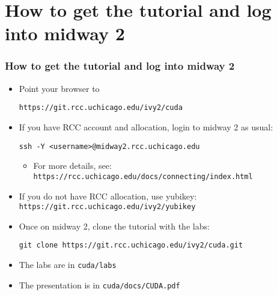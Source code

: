 \section{How to get the tutorial and log into midway 2}
\begin{frame}[fragile]
  \frametitle{How to get the tutorial and log into midway 2}
  \begin{itemize}
  \item Point your browser to
    {\small
      {\color{mycolorcli}
\begin{verbatim}
https://git.rcc.uchicago.edu/ivy2/cuda
\end{verbatim}
      }
    }
    \item If you have RCC account and allocation, login to midway 2 as usual: 
{\color{mycolorcli}
\begin{verbatim}
ssh -Y <username>@midway2.rcc.uchicago.edu
\end{verbatim}
}
\begin{itemize}
\item For more details, see:
  {\color{mycolorcli}\verb|https://rcc.uchicago.edu/docs/connecting/index.html|}
\end{itemize}
\item If you do not have RCC allocation, use yubikey: {\color{mycolorcli}\verb|https://git.rcc.uchicago.edu/ivy2/yubikey|}
\item Once on midway 2, clone the tutorial with the labs:
    {\small
      {\color{mycolorcli}
\begin{verbatim}
git clone https://git.rcc.uchicago.edu/ivy2/cuda.git
\end{verbatim}
      }
    }
    \item The labs are in  {\color{mycolorcli}\verb|cuda/labs|}
    \item The presentation is in  {\color{mycolorcli}\verb|cuda/docs/CUDA.pdf|}
    \end{itemize}
  \end{frame}
